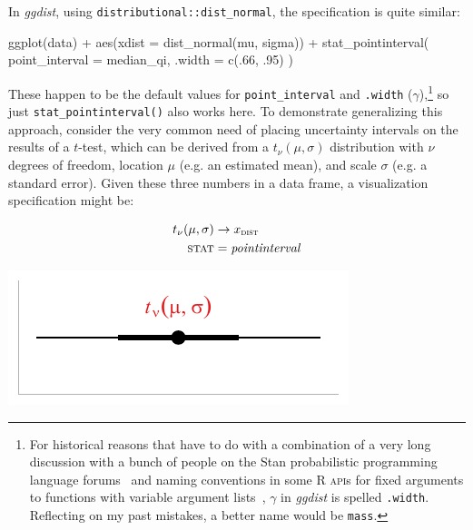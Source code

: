 \documentclass[journal]{vgtc}                     %
\newenvironment{centerverbatim}{%
  \hfill\break
  \small
  \centering
  \varwidth{\linewidth}%
  \verbatim
}{%
  \endverbatim
  \endvarwidth
  \par
  \hfill\break
}
\begin{document}
In \textit{ggdist}, using \texttt{distributional::dist\_normal}, the specification is quite similar:

\begin{centerverbatim}
ggplot(data) +
  aes(xdist = dist_normal(mu, sigma)) +
  stat_pointinterval(
    point_interval = median_qi, 
    .width = c(.66, .95)
  )
\end{centerverbatim}

These happen to be the default values for \texttt{point\_interval} and \texttt{.width} ($\gamma$),\footnote{For historical reasons that have to do with a combination of a very long discussion with a bunch of people on the Stan probabilistic programming language forums~\cite{kay2018stannames} and naming conventions in some R \textsc{api}s for fixed arguments to functions with variable argument lists~\cite{tidyverse2020dotprefix}, $\gamma$ in \textit{ggdist} is spelled \texttt{.width}. Reflecting on my past mistakes, a better name would be  \texttt{mass}.} so just \texttt{stat\_pointinterval()}  also works here. To demonstrate generalizing this approach, consider the very common need of placing uncertainty intervals on the results of a $t$-test, which can be derived from a $t_\nu(\mu, \sigma)$  distribution with $\nu$ degrees of freedom, location $\mu$ (e.g. an estimated mean), and scale $\sigma$ (e.g. a standard error). Given these three numbers in a data frame, a visualization specification might be:

\noindent
\begin{minipage}{.5\columnwidth}

\begin{align*}
t_{\nu}(\mu, \sigma) &\rightarrow x_\textsc{dist}\\
\textsc{stat} &= \mathit{pointinterval}
\end{align*}
\end{minipage}%
  \begin{minipage}{.4\columnwidth}
    \centering
    \includegraphics[width=1.2\columnwidth]{figs/3-stat_pointinterval_student_t.pdf}
  \end{minipage}
\hfill\break
\end{document}
